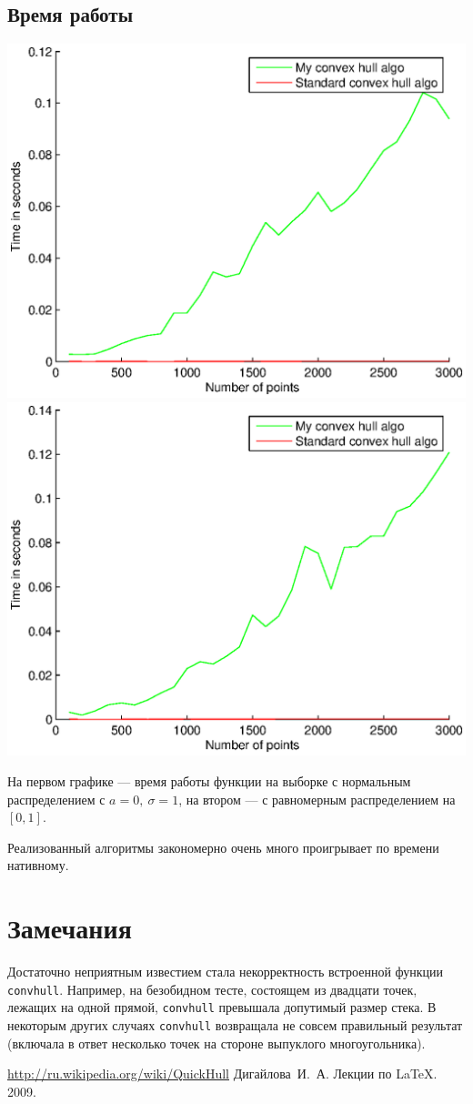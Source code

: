 \documentclass[11pt]{article}
\begin{document}
\subsection{Время работы}
\includegraphics[scale=0.5]{time1.eps}
\includegraphics[scale=0.5]{time2.eps}

На первом графике --- время работы функции на выборке с нормальным распределением с $a = 0,\	 \sigma = 1$, на втором --- с равномерным распределением на $[0,1]$.

Реализованный алгоритмы закономерно очень много проигрывает по времени нативному.

\section{Замечания}
Достаточно неприятным известием стала некорректность встроенной функции \texttt{convhull}. Например, на безобидном тесте, состоящем из двадцати точек, лежащих на одной прямой, \texttt{convhull} превышала допутимый размер стека. В некоторым других случаях \texttt{convhull} возвращала не совсем правильный результат (включала в ответ несколько точек на стороне выпуклого многоугольника).

\begin{thebibliography}{99}
	 \url{http://ru.wikipedia.org/wiki/QuickHull}
	 Дигайлова~И.~А. Лекции по \LaTeX. 2009.
\end{thebibliography}
\end{document}
